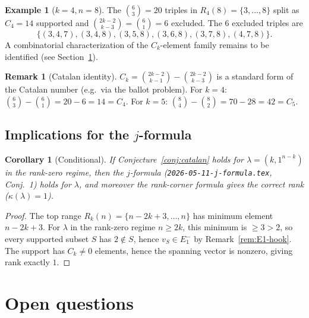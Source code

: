 \documentclass[11pt]{article}
\newtheorem{corollary}[theorem]{Corollary}
\theoremstyle{definition}
\newtheorem{remark}[theorem]{Remark}
\newtheorem{example}[theorem]{Example}
\begin{document}
\begin{example}[$k=4,n=8$]
The $\binom{6}{3}=20$ triples in $R_4(8)=\{3,\ldots,8\}$ split as
$C_4=14$ supported and $\binom{2k-2}{k-3}=\binom{6}{1}=6$ excluded.
The $6$ excluded triples are
\[
   \{(3,4,7),(3,4,8),(3,5,8),(3,6,8),(3,7,8),(4,7,8)\}.
\]
A combinatorial characterization of the $C_k$-element family remains
to be identified (see Section~\ref{sec:open}).
\end{example}

\begin{remark}[Catalan identity]
$C_k = \binom{2k-2}{k-1}-\binom{2k-2}{k-3}$ is a standard form of the
Catalan number (e.g.\ via the ballot problem).  For $k=4$:
$\binom{6}{3}-\binom{6}{1}=20-6=14=C_4$.  For $k=5$:
$\binom{8}{4}-\binom{8}{2}=70-28=42=C_5$.
\end{remark}

\subsection{Implications for the $j$-formula}

\begin{corollary}[Conditional]\label{cor:j-from-catalan}
If Conjecture~\ref{conj:catalan} holds for $\lambda=(k,1^{n-k})$ in the
rank-zero regime, then the $j$-formula
(\texttt{2026-05-11-j-formula.tex}, Conj.~1) holds for $\lambda$, and
moreover the rank-corner formula gives the correct rank
($\kappa(\lambda)=1$).
\end{corollary}

\begin{proof}
The top range $R_k(n)=\{n-2k+3,\ldots,n\}$ has minimum element
$n-2k+3$.  For $\lambda$ in the rank-zero regime $n\ge 2k$, this
minimum is $\ge 3>2$, so every supported subset $S$ has $2\notin S$,
hence $v_S\in E_1^-$ by Remark~\ref{rem:E1-hook}.  The support has
$C_k\ne 0$ elements, hence the spanning vector is nonzero, giving
rank exactly $1$.
\end{proof}

\section{Open questions}\label{sec:open}
\end{document}
